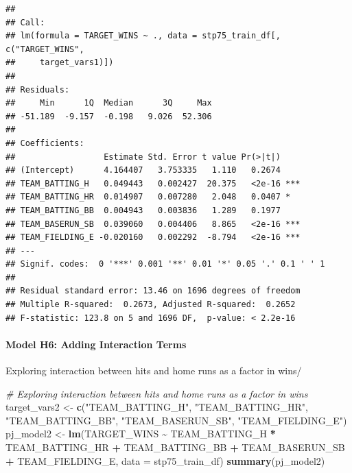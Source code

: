 \documentclass[
]{article}
\newenvironment{Shaded}{\begin{snugshade}}{\end{snugshade}}
\newcommand{\AttributeTok}[1]{\textcolor[rgb]{0.13,0.29,0.53}{#1}}
\newcommand{\CommentTok}[1]{\textcolor[rgb]{0.56,0.35,0.01}{\textit{#1}}}
\newcommand{\FunctionTok}[1]{\textcolor[rgb]{0.13,0.29,0.53}{\textbf{#1}}}
\newcommand{\NormalTok}[1]{#1}
\newcommand{\OtherTok}[1]{\textcolor[rgb]{0.56,0.35,0.01}{#1}}
\newcommand{\SpecialCharTok}[1]{\textcolor[rgb]{0.81,0.36,0.00}{\textbf{#1}}}
\newcommand{\StringTok}[1]{\textcolor[rgb]{0.31,0.60,0.02}{#1}}
\begin{document}
\begin{verbatim}
## 
## Call:
## lm(formula = TARGET_WINS ~ ., data = stp75_train_df[, c("TARGET_WINS", 
##     target_vars1)])
## 
## Residuals:
##     Min      1Q  Median      3Q     Max 
## -51.189  -9.157  -0.198   9.026  52.306 
## 
## Coefficients:
##                  Estimate Std. Error t value Pr(>|t|)    
## (Intercept)      4.164407   3.753335   1.110   0.2674    
## TEAM_BATTING_H   0.049443   0.002427  20.375   <2e-16 ***
## TEAM_BATTING_HR  0.014907   0.007280   2.048   0.0407 *  
## TEAM_BATTING_BB  0.004943   0.003836   1.289   0.1977    
## TEAM_BASERUN_SB  0.039060   0.004406   8.865   <2e-16 ***
## TEAM_FIELDING_E -0.020160   0.002292  -8.794   <2e-16 ***
## ---
## Signif. codes:  0 '***' 0.001 '**' 0.01 '*' 0.05 '.' 0.1 ' ' 1
## 
## Residual standard error: 13.46 on 1696 degrees of freedom
## Multiple R-squared:  0.2673, Adjusted R-squared:  0.2652 
## F-statistic: 123.8 on 5 and 1696 DF,  p-value: < 2.2e-16
\end{verbatim}

\paragraph{Model H6: Adding Interaction
Terms}\label{model-h6-adding-interaction-terms}

Exploring interaction between hits and home runs as a factor in wins/

\begin{Shaded}
\begin{Highlighting}[]
\CommentTok{\# Exploring interaction between hits and home runs as a factor in wins}
\NormalTok{target\_vars2 }\OtherTok{\textless{}{-}} \FunctionTok{c}\NormalTok{(}\StringTok{"TEAM\_BATTING\_H"}\NormalTok{, }\StringTok{"TEAM\_BATTING\_HR"}\NormalTok{, }\StringTok{"TEAM\_BATTING\_BB"}\NormalTok{, }\StringTok{"TEAM\_BASERUN\_SB"}\NormalTok{, }\StringTok{"TEAM\_FIELDING\_E"}\NormalTok{)}
\NormalTok{pj\_model2 }\OtherTok{\textless{}{-}} \FunctionTok{lm}\NormalTok{(TARGET\_WINS }\SpecialCharTok{\textasciitilde{}}\NormalTok{ TEAM\_BATTING\_H }\SpecialCharTok{*}\NormalTok{ TEAM\_BATTING\_HR }\SpecialCharTok{+}\NormalTok{ TEAM\_BATTING\_BB }\SpecialCharTok{+}\NormalTok{ TEAM\_BASERUN\_SB }\SpecialCharTok{+}\NormalTok{ TEAM\_FIELDING\_E, }\AttributeTok{data =}\NormalTok{ stp75\_train\_df)}
\FunctionTok{summary}\NormalTok{(pj\_model2)}
\end{Highlighting}
\end{Shaded}
\end{document}
